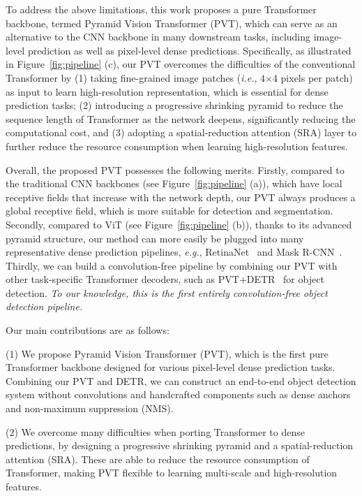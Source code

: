 \documentclass[10pt,twocolumn,letterpaper]{article}
\def\ie{\emph{i.e.}}
\def\eg{\emph{e.g.}}
\begin{document}
To address the above limitations, 
%
this work proposes a pure Transformer backbone,
termed Pyramid Vision Transformer (PVT), which can serve as an alternative to the CNN backbone in many 
%
downstream tasks, including image-level prediction as well as  pixel-level dense predictions.
%
Specifically, as illustrated in Figure~\ref{fig:pipeline} (c), 
%
%
our PVT overcomes the difficulties of the conventional Transformer by (1) taking fine-grained image patches (\ie, 4$\times$4 pixels per patch) as input to learn high-resolution representation, which is essential for dense prediction tasks;
%
(2) introducing a progressive shrinking pyramid to reduce the sequence length of Transformer as the network deepens,
%
significantly reducing the computational cost, and (3) adopting a spatial-reduction attention (SRA) layer to further reduce the resource consumption when learning high-resolution features.

Overall, the proposed PVT possesses the following merits.
%
Firstly, compared to the 
%
traditional
CNN backbones (see Figure~\ref{fig:pipeline} (a)), which have local receptive fields that increase with the network depth, our PVT always produces a global receptive field,
%
which is more suitable for detection and segmentation.
%
%
Secondly, compared to ViT (see Figure~\ref{fig:pipeline} (b)), thanks to its advanced pyramid structure, our method can more easily be plugged into many representative dense prediction pipelines, \eg, RetinaNet~\cite{lin2017focal} and Mask R-CNN~\cite{he2017mask}.
%
Thirdly,
we can build a convolution-free pipeline by combining our PVT with other task-specific
Transformer decoders,
%
such as PVT+DETR~\cite{carion2020end} for object detection.
\emph{To our knowledge, this is the first entirely convolution-free object detection pipeline.}
%
%
%
%

Our main contributions are as follows:
%
    
    (1) We propose Pyramid Vision Transformer (PVT), which is the first pure Transformer backbone designed for various pixel-level dense prediction tasks.
    Combining our PVT and DETR, we can construct an end-to-end object detection system without convolutions and handcrafted components such as dense anchors and non-maximum suppression (NMS).
    
    (2) We overcome many difficulties when porting Transformer to dense
    predictions, by designing a
    progressive shrinking pyramid and a spatial-reduction attention (SRA). These are able to reduce the resource consumption of Transformer, making PVT flexible to learning multi-scale and high-resolution features.
    
\end{document}
